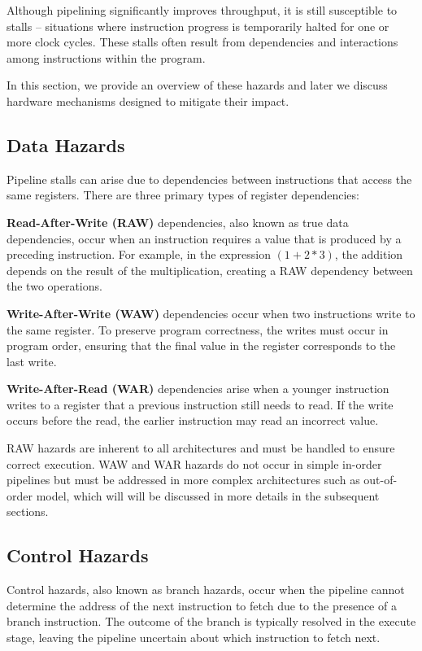 Although pipelining significantly improves throughput, it is still susceptible to stalls -- situations where instruction progress is temporarily halted for one or more clock cycles. These stalls often result from dependencies and interactions among instructions within the program. 

In this section, we provide an overview of these hazards and later we discuss hardware mechanisms designed to mitigate their impact.

\subsection{Data Hazards}

Pipeline stalls can arise due to dependencies between instructions that access the same registers. There are three primary types of register dependencies:

\textbf{Read-After-Write (RAW)} dependencies, also known as true data dependencies, occur when an instruction requires a value that is produced by a preceding instruction. For example, in the expression $(1 + 2 * 3)$, the addition depends on the result of the multiplication, creating a RAW dependency between the two operations.

\textbf{Write-After-Write (WAW)} dependencies occur when two instructions write to the same register. To preserve program correctness, the writes must occur in program order, ensuring that the final value in the register corresponds to the last write.

\textbf{Write-After-Read (WAR)} dependencies arise when a younger instruction writes to a register that a previous instruction still needs to read. If the write occurs before the read, the earlier instruction may read an incorrect value.

RAW hazards are inherent to all architectures and must be handled to ensure correct execution. WAW and WAR hazards do not occur in simple in-order pipelines but must be addressed in more complex architectures such as out-of-order model, which will will be discussed in more details in the subsequent sections.

\subsection{Control Hazards}

Control hazards, also known as branch hazards, occur when the pipeline cannot determine the address of the next instruction to fetch due to the presence of a branch instruction. The outcome of the branch is typically resolved in the execute stage, leaving the pipeline uncertain about which instruction to fetch next.

